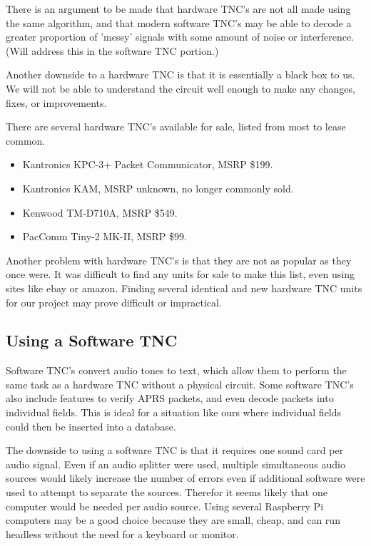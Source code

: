 \documentclass[onecolumn, draftclsnofoot, 10pt, compsoc]{IEEEtran}
\begin{document}
There is an argument to be made that hardware TNC's are not all made using the same algorithm, and that modern software TNC's may be able to decode a greater proportion of 'messy' signals with some amount of noise or interference.  (Will address this in the software TNC portion.)

Another downside to a hardware TNC is that it is essentially a black box to us.  We will not be able to understand the circuit well enough to make any changes, fixes, or improvements.\cite{2}

There are several hardware TNC's available for sale, listed from most to lease common.
\begin{itemize}
	\item Kantronics KPC-3+ Packet Communicator, MSRP \$199.
    \item Kantronics KAM, MSRP unknown, no longer commonly sold.
    \item Kenwood TM-D710A, MSRP \$549.
    \item PacComm Tiny-2 MK-II, MSRP \$99.
\end{itemize}

Another problem with hardware TNC's is that they are not as popular as they once were.  It was difficult to find any units for sale to make this list, even using sites like ebay or amazon.  Finding several identical and new hardware TNC units for our project may prove difficult or impractical.

\subsection{Using a Software TNC}

Software TNC's convert audio tones to text, which allow them to perform the same task as a hardware TNC without a physical circuit.  Some software TNC's also include features to verify APRS packets, and even decode packets into individual fields.  This is ideal for a situation like ours where individual fields could then be inserted into a database.

The downside to using a software TNC is that it requires one sound card per audio signal.  Even if an audio splitter were used, multiple simultaneous audio sources would likely increase the number of errors even if additional software were used to attempt to separate the sources.  Therefor it seems likely that one computer would be needed per audio source.  Using several Raspberry Pi computers may be a good choice because they are small, cheap, and can run headless without the need for a keyboard or monitor.
\end{document}
